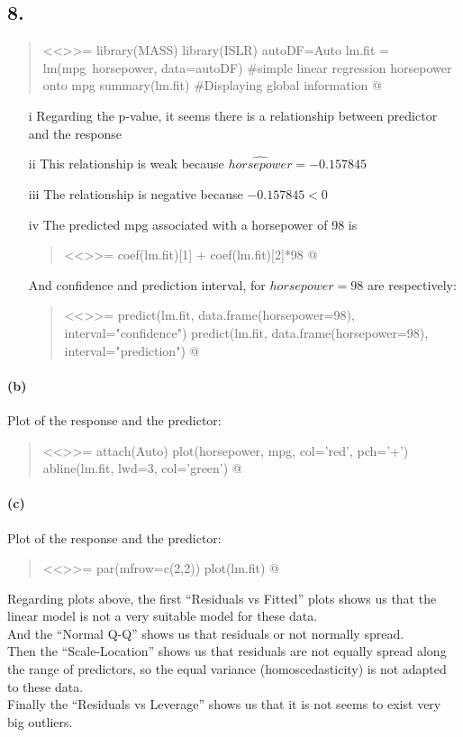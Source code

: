 \documentclass[a4paper, 10pt]{scrartcl}  %
\begin{document}
\subsection{8.}
\begin{abstract}
<<>>=
library(MASS)
library(ISLR)
autoDF=Auto
lm.fit = lm(mpg~horsepower, data=autoDF) #simple linear regression horsepower onto mpg
summary(lm.fit) #Displaying global information
@
\end{abstract}
\begin{itemize}
	\item[i] Regarding the p-value, it seems there is a 
		relationship between predictor and the response
	\item[ii] This relationship is weak because  
		$\widehat{horsepower}=-0.157845$
	\item[iii] The relationship is negative because $-0.157845<0$
	\item[iv] The predicted mpg associated with a horsepower 
		of 98 is
		\begin{abstract}
			<<>>=
			coef(lm.fit)[1] + coef(lm.fit)[2]*98
			@
		\end{abstract}
		And confidence and prediction interval, for 
		$horsepower=98$ are respectively:
		\begin{abstract}
			<<>>=
			predict(lm.fit, data.frame(horsepower=98), interval="confidence")
			predict(lm.fit, data.frame(horsepower=98), interval="prediction")
			@
		\end{abstract}
\end{itemize}
\paragraph{(b)}
Plot of the response and the predictor:
\begin{abstract}
<<>>=
attach(Auto)
plot(horsepower, mpg, col='red', pch='+')
abline(lm.fit, lwd=3, col='green')
@
\end{abstract}
\paragraph{(c)}
Plot of the response and the predictor:
\begin{abstract}
<<>>=
par(mfrow=c(2,2))
plot(lm.fit)
@
\end{abstract}
Regarding plots above, the first ``Residuals vs Fitted'' plots shows us
that the linear model is not a very suitable model for these data.\\
And the ``Normal Q-Q'' shows us that residuals or not normally 
spread.\\ Then the ``Scale-Location'' shows us that residuals are not 
equally spread along the range of predictors, so the equal variance
(homoscedasticity) is not adapted to these data.\\
Finally the ``Residuals vs Leverage'' shows us that it is not seems to
exist very big outliers.
\end{document}
